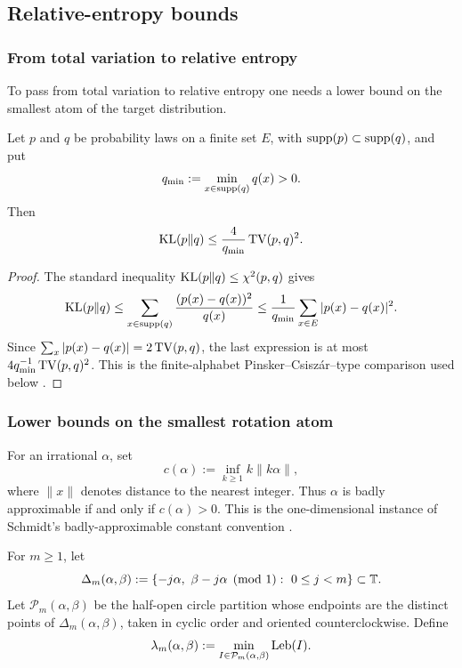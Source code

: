 \subsection{Relative-entropy bounds}

\subsubsection{From total variation to relative entropy}

To pass from total variation to relative entropy one needs a lower bound on the
smallest atom of the target distribution.

\begin{lemma}\label{lem:kl-from-tv-qmin}
Let \(p\) and \(q\) be probability laws on a finite set \(E\), with
\(\operatorname{supp}(p)\subset\operatorname{supp}(q)\), and put
\[
q_{\min}:=\min_{x\in\operatorname{supp}(q)}q(x)>0.
\]
Then
\[
\operatorname{KL}(p\|q)\le \frac{4}{q_{\min}}\operatorname{TV}(p,q)^2.
\]
\end{lemma}

\begin{proof}
The standard inequality \(\operatorname{KL}(p\|q)\le \chi^2(p,q)\) gives
\[
\operatorname{KL}(p\|q)
\le \sum_{x\in\operatorname{supp}(q)}\frac{(p(x)-q(x))^2}{q(x)}
\le \frac{1}{q_{\min}}\sum_{x\in E}|p(x)-q(x)|^2.
\]
Since \(\sum_x |p(x)-q(x)|=2\operatorname{TV}(p,q)\), the last expression is at most
\(4q_{\min}^{-1}\operatorname{TV}(p,q)^2\).  This is the finite-alphabet
Pinsker--Csisz\'ar--type comparison used below
\cite{Csiszar1975IdivergenceGeometry,SasonVerdu2016fDivergence}.
\end{proof}

\subsubsection{Lower bounds on the smallest rotation atom}

\begin{definition}\label{def:diophantine-lower-bound}
For an irrational \(\alpha\), set
\[
c(\alpha):=\inf_{k\ge1} k\|k\alpha\|,
\]
where \(\|x\|\) denotes distance to the nearest integer. Thus
\(\alpha\) is badly approximable if and only if \(c(\alpha)>0\).
This is the one-dimensional instance of Schmidt's badly-approximable
constant convention \cite{Schmidt1969BadlyApproximableSystems}.
\end{definition}

\begin{definition}\label{def:general-window-partition-scale}
For \(m\ge1\), let
\[
\Delta_m(\alpha,\beta)
:=\{-j\alpha,\ \beta-j\alpha \pmod 1:\ 0\le j<m\}\subset\mathbb{T} .
\]
Let \(\mathcal P_m(\alpha,\beta)\) be the half-open circle partition whose
endpoints are the distinct points of \(\Delta_m(\alpha,\beta)\), taken in
cyclic order and oriented counterclockwise.  Define
\[
\lambda_m(\alpha,\beta)
:=
\min_{I\in\mathcal P_m(\alpha,\beta)}\mathrm{Leb}(I).
\]
\end{definition}

